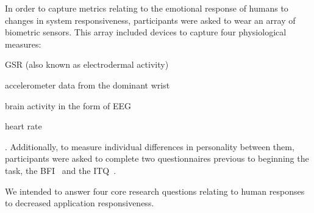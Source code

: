 In order to capture metrics relating to the emotional response of humans to changes in system responsiveness, participants were asked to wear an array of biometric sensors.
This array included devices to capture four physiological measures:
\begin{enumerate*}[itemjoin={{, }}, itemjoin*={{, and }}]
    \item \gls{GSR} (also known as electrodermal activity)
    \item accelerometer data from the dominant wrist
    \item brain activity in the form of \gls{EEG}
    \item heart rate
\end{enumerate*}.
Additionally, to measure individual differences in personality between them, participants were asked to complete two questionnaires previous to beginning the task, the \gls{BFI}~\cite{john1999big} and the \gls{ITQ}~\cite{witmer1998measuring}.





We intended to answer four core research questions relating to human responses to decreased application responsiveness.

